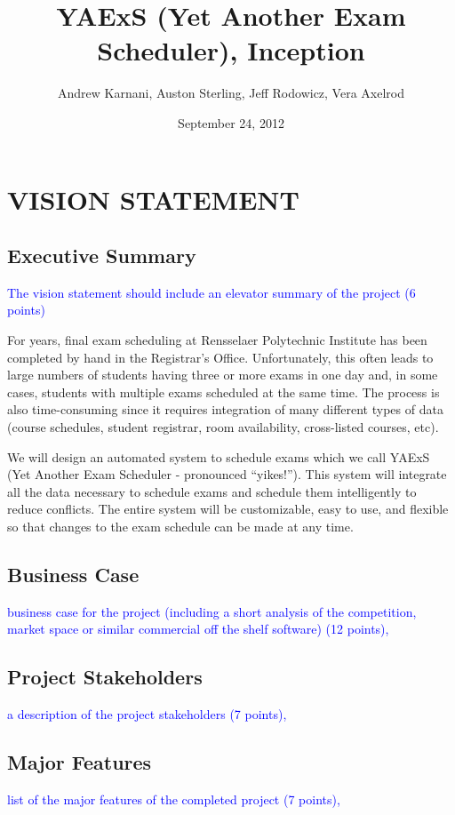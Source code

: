 \documentclass[11pt]{article}
\author{Andrew Karnani, Auston Sterling, Jeff Rodowicz, Vera Axelrod}
\title{YAExS (Yet Another Exam Scheduler), Inception}
\date{September 24, 2012}
\begin{document}
\maketitle

\section{VISION STATEMENT}
\subsection{Executive Summary} %
\textcolor{blue}{The vision statement should include an elevator summary of the project (6 points)}

For years, final exam scheduling at Rensselaer Polytechnic Institute has been completed by hand in the Registrar’s Office. 
Unfortunately, this often leads to large numbers of students having three or more exams in one day and, in some cases, students with multiple exams scheduled at the same time.  
 The process is also time-consuming since it requires integration of many different types of data (course schedules, student registrar, room availability, cross-listed courses, etc). 


We will design an automated system to schedule exams which we call YAExS (Yet Another Exam Scheduler - pronounced “yikes!”). 
This system will integrate all the data necessary to schedule exams and schedule them intelligently to reduce conflicts. 
The entire system will be customizable, easy to use, and flexible so that changes to the exam schedule can be made at any time. 

\subsection{Business Case} %
\textcolor{blue}{ business case for the project (including a short analysis of the competition, market space or similar commercial off the shelf software) (12 points),}
\subsection{Project Stakeholders} %
\textcolor{blue}{a description of the project stakeholders (7 points),}
\subsection{Major Features} %
\textcolor{blue}{ list of the major features of the completed project (7 points),}
\end{document}
